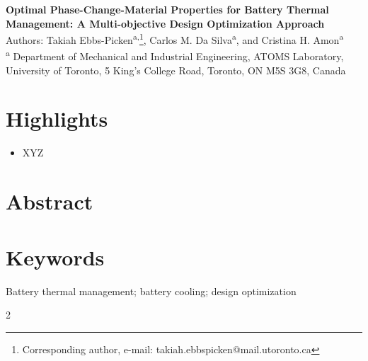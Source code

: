 \documentclass[12pt]{article}
\date{\today}
\newenvironment{romanPagenumber}[1]
{\setcounter{page}{#1}\renewcommand{\thepage}{\roman{page}}}
{\pagenumbering{arabic}}
\begin{document}
\begin{titlepage}
	\centering
	\vfill
	\Huge{
		\textbf{Optimal Phase-Change-Material Properties for Battery Thermal Management: A Multi-objective Design Optimization Approach} 
	}
	\\ 
	\medskip
	\large{
		Authors: Takiah Ebbs-Picken\textsuperscript{a,}\footnote{Corresponding author, e-mail: takiah.ebbspicken@mail.utoronto.ca}, Carlos M. Da Silva\textsuperscript{a}, and Cristina H. Amon\textsuperscript{a}
	}
	\\
	\medskip
	\small{
		\textsuperscript{a} Department of Mechanical and Industrial Engineering, ATOMS Laboratory, University of Toronto, 5 King’s College Road, Toronto, ON M5S 3G8, Canada
		\\
		
	}
	\vfill
\end{titlepage}

\clearpage %

\begin{romanPagenumber}{2} %
	
\section*{Highlights}
%
\begin{itemize}
	\item XYZ
\end{itemize}

\section*{Abstract}
%


\section*{Keywords}
%
Battery thermal management; battery cooling; design optimization

\newpage


\tableofcontents %
\clearpage
{}
\begin{scriptsize}
	\begin{multicols}{2}
	\end{multicols}
\end{scriptsize}

\clearpage
\end{romanPagenumber} %
\end{document}
